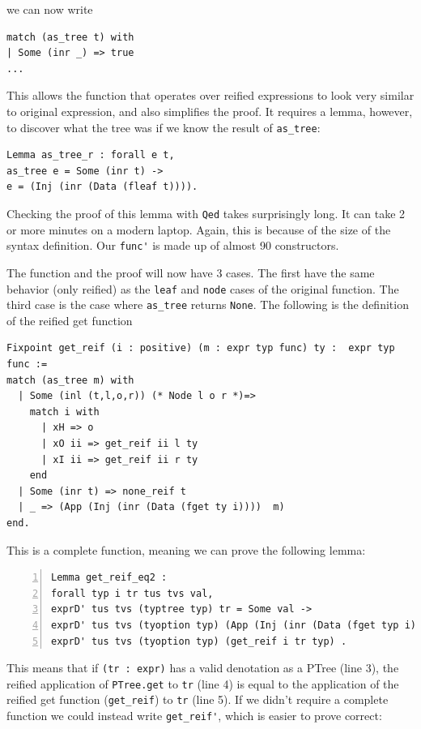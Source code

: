 \documentclass{puthesis}
\begin{document}
we can now write

\begin{lstlisting}
match (as_tree t) with
| Some (inr _) => true
...
\end{lstlisting}

This allows the function that operates over reified expressions to look very
similar to original expression, and also simplifies the proof. It
requires a lemma, however, to discover what the tree was if we know
the result of \lstinline|as_tree|:

\begin{lstlisting}
Lemma as_tree_r : forall e t,
as_tree e = Some (inr t) ->
e = (Inj (inr (Data (fleaf t)))).
\end{lstlisting}

Checking the proof of this lemma with \lstinline|Qed| takes
surprisingly long. It can take 2 or more minutes on a modern
laptop. Again, this is because of the size of the syntax definition.
Our \lstinline|func'| is made up of almost 90 constructors.

The function and the proof will now have 3 cases. The first have the
same behavior (only reified) as the \lstinline|leaf| and
\lstinline|node| cases of the original function. The third case is the
case where \lstinline|as_tree| returns \lstinline|None|. The following is the
definition of the reified get function

\begin{lstlisting}
Fixpoint get_reif (i : positive) (m : expr typ func) ty :  expr typ func :=
match (as_tree m) with
  | Some (inl (t,l,o,r)) (* Node l o r *)=>
    match i with 
      | xH => o
      | xO ii => get_reif ii l ty 
      | xI ii => get_reif ii r ty 
    end
  | Some (inr t) => none_reif t
  | _ => (App (Inj (inr (Data (fget ty i))))  m)
end.
\end{lstlisting}

This is a complete function, meaning we can prove the following lemma:

\begin{lstlisting}[numbers=left]
Lemma get_reif_eq2 :
forall typ i tr tus tvs val,
exprD' tus tvs (typtree typ) tr = Some val ->
exprD' tus tvs (tyoption typ) (App (Inj (inr (Data (fget typ i)))) tr)  =
exprD' tus tvs (tyoption typ) (get_reif i tr typ) .
\end{lstlisting}

This means that if \lstinline|(tr : expr)| has a valid denotation as a
PTree (line 3), the reified application of \lstinline|PTree.get| to
\lstinline|tr| (line 4) is equal to the application of the reified get
function (\lstinline|get_reif|) to \lstinline|tr| (line 5).  If we
didn't require a complete function we could instead write
\lstinline|get_reif'|, which is easier to prove correct:
\end{document}
